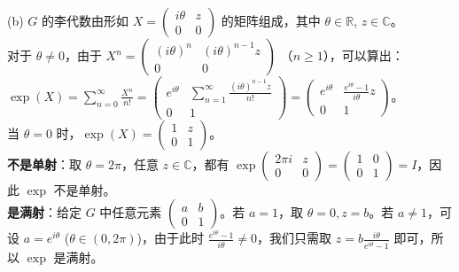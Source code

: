 \documentclass{ctexart}
\begin{document}
(b) $G$ 的李代数由形如 $X = \begin{pmatrix} i\theta & z \\ 0 & 0 \end{pmatrix}$ 的矩阵组成，其中 $\theta \in \mathbb{R}$, $z \in \mathbb{C}$。\\
对于 $\theta \neq 0$，由于 $X^n = \begin{pmatrix} (i\theta)^n & (i\theta)^{n-1} z \\ 0 & 0 \end{pmatrix}$ （$n \ge 1$），可以算出：\\
$\exp(X) = \sum_{n=0}^\infty \frac{X^n}{n!} = \begin{pmatrix} e^{i\theta} & \sum_{n=1}^\infty \frac{(i\theta)^{n-1} z}{n!} \\ 0 & 1 \end{pmatrix} = \begin{pmatrix} e^{i\theta} & \frac{e^{i\theta} - 1}{i\theta} z \\ 0 & 1 \end{pmatrix}$。\\
当 $\theta=0$ 时，$\exp(X) = \begin{pmatrix} 1 & z \\ 0 & 1 \end{pmatrix}$。\\
\textbf{不是单射}：取 $\theta = 2\pi$，任意 $z \in \mathbb{C}$，都有 $\exp \begin{pmatrix} 2\pi i & z \\ 0 & 0 \end{pmatrix} = \begin{pmatrix} 1 & 0 \\ 0 & 1 \end{pmatrix} = I$，因此 $\exp$ 不是单射。\\
\textbf{是满射}：给定 $G$ 中任意元素 $\begin{pmatrix} a & b \\ 0 & 1 \end{pmatrix}$。若 $a = 1$，取 $\theta = 0, z = b$。若 $a \neq 1$，可设 $a = e^{i\theta}$ ($\theta \in (0, 2\pi)$)，由于此时 $\frac{e^{i\theta}-1}{i\theta} \neq 0$，我们只需取 $z = b \frac{i\theta}{e^{i\theta}-1}$ 即可，所以 $\exp$ 是满射。
\end{document}

